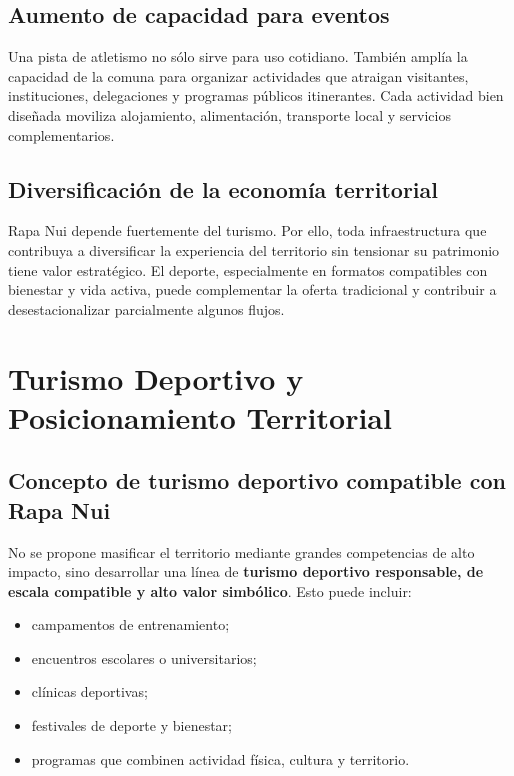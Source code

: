 \documentclass[12pt,letterpaper]{article}
\begin{document}
\subsection{Aumento de capacidad para eventos}

Una pista de atletismo no sólo sirve para uso cotidiano. También amplía la capacidad de la comuna para organizar actividades que atraigan visitantes, instituciones, delegaciones y programas públicos itinerantes. Cada actividad bien diseñada moviliza alojamiento, alimentación, transporte local y servicios complementarios.

\subsection{Diversificación de la economía territorial}

Rapa Nui depende fuertemente del turismo. Por ello, toda infraestructura que contribuya a diversificar la experiencia del territorio sin tensionar su patrimonio tiene valor estratégico. El deporte, especialmente en formatos compatibles con bienestar y vida activa, puede complementar la oferta tradicional y contribuir a desestacionalizar parcialmente algunos flujos.

\section{Turismo Deportivo y Posicionamiento Territorial}

\subsection{Concepto de turismo deportivo compatible con Rapa Nui}

No se propone masificar el territorio mediante grandes competencias de alto impacto, sino desarrollar una línea de \textbf{turismo deportivo responsable, de escala compatible y alto valor simbólico}. Esto puede incluir:

\begin{itemize}
    \item campamentos de entrenamiento;
    \item encuentros escolares o universitarios;
    \item clínicas deportivas;
    \item festivales de deporte y bienestar;
    \item programas que combinen actividad física, cultura y territorio.
\end{itemize}
\end{document}
